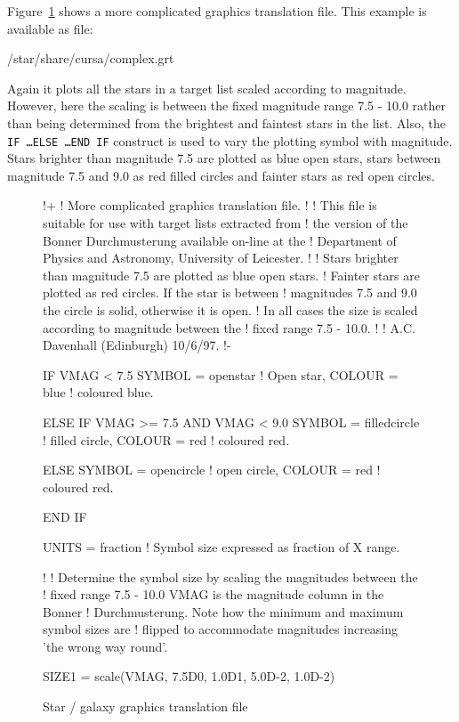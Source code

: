 \documentclass[twoside,11pt]{starlink}
\begin{document}
Figure~\ref{GRAPHTRAN2} shows a more complicated graphics translation
file.  This example is available as file:

\begin{terminalv}
/star/share/cursa/complex.grt
\end{terminalv}

Again it plots all the stars in a target list scaled according to
magnitude.  However, here the scaling is between the fixed magnitude
range 7.5 - 10.0 rather than being determined from the brightest and
faintest stars in the list.  Also, the \texttt{IF \ldots ELSE \ldots END
IF} construct is used to vary the plotting symbol with magnitude.  Stars
brighter than magnitude 7.5 are plotted as blue open stars, stars
between magnitude 7.5 and 9.0 as red filled circles and fainter stars as
red open circles.

\begin{figure}[htbp]
\begin{terminalv}
!+
! More complicated graphics translation file.
!
! This file is suitable for use with target lists extracted from
! the version of the Bonner Durchmusterung available on-line at the
! Department of Physics and Astronomy, University of Leicester.
!
! Stars brighter than magnitude 7.5 are plotted as blue open stars.
! Fainter stars are plotted as red circles.  If the star is between
! magnitudes 7.5 and 9.0 the circle is solid, otherwise it is open.
! In all cases the size is scaled according to magnitude between the
! fixed range 7.5 - 10.0.
!
! A.C. Davenhall (Edinburgh) 10/6/97.
!-

IF VMAG < 7.5
  SYMBOL = openstar       ! Open star,
  COLOUR = blue           ! coloured blue.

ELSE IF VMAG >= 7.5  AND  VMAG < 9.0
  SYMBOL = filledcircle   ! filled circle,
  COLOUR = red            ! coloured red.

ELSE
  SYMBOL = opencircle     ! open circle,
  COLOUR = red            ! coloured red.

END IF

UNITS  = fraction         ! Symbol size expressed as fraction of X range.

!
! Determine the symbol size by scaling the magnitudes between the
! fixed range 7.5 - 10.0  VMAG is the magnitude column in the Bonner
! Durchmusterung.  Note how the minimum and maximum symbol sizes are
! flipped to accommodate magnitudes increasing 'the wrong way round'.

SIZE1  = scale(VMAG, 7.5D0, 1.0D1, 5.0D-2, 1.0D-2)
\end{terminalv}

\caption{Star / galaxy graphics translation file \label{GRAPHTRAN2} }

\end{figure}
\end{document}
